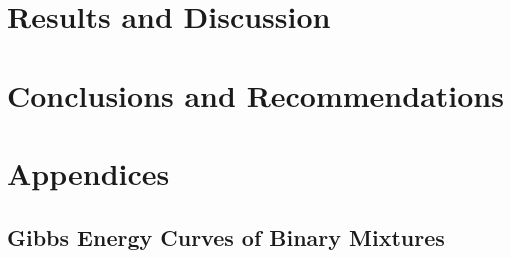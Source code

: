 \documentclass[a4paperm,bezier,amstex]{report}
\numberwithin{equation}{section}
\numberwithin{figure}{section}
\begin{document}
	
	\chapter{Results and Discussion}
		
		
				
	\chapter{Conclusions and Recommendations}
		
		
	
    \renewcommand{\bibname}{References}
	
		
	\appendix
	\chapter*{Appendices}
	\renewcommand\thesection{\Alph{section}}
	\renewcommand\thesubsection{\thesection.\arabic{subsection}}
	\section{Gibbs Energy Curves of Binary Mixtures}\label{AppendixGibbsPlotsBinaries}
		
		
\end{document}
